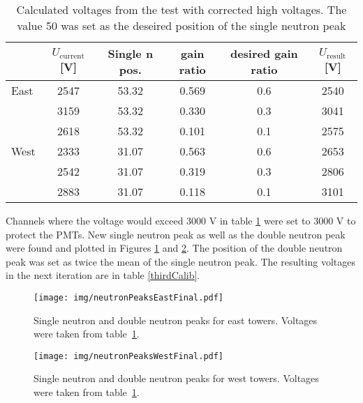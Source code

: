 \begin{table}[htb] 
\caption{Calculated voltages from the test with corrected high voltages.
The value 50 was set as the deseired position of the single neutron peak}
\label{corected}
\begin{center}
\begin{tabular}{lccccc}
 \toprule
 &$U_\text{current}$[V]&Single n pos.&gain ratio&desired gain ratio&$U_\text{result}$[V]\\
\midrule
 East&2547&53.32&0.569&0.6&2540\\
     &3159&53.32&0.330&0.3&3041\\
     &2618&53.32&0.101&0.1&2575\\
 \midrule
West&2333&31.07&0.563&0.6&2653\\
    &2542&31.07&0.319&0.3&2806\\
    &2883&31.07&0.118&0.1&3101\\
 \bottomrule
\end{tabular}
\end{center}
\end{table}

Channels where the voltage would exceed 3000 V in table \ref{corected} were set to 3000 V to
protect the PMTs. New single neutron peak as well as the double neutron peak were found and
plotted in Figures \ref{eastThird}
and \ref{westThird}. The position of the double neutron peak was set as twice the mean
of the single neutron peak.
The resulting voltages in the next iteration are in table \ref{thirdCalib}.

\begin{figure}[htb]
\begin{center}
\texttt{[image: img/neutronPeaksEastFinal.pdf]}
\end{center}
\caption{Single neutron and double neutron peaks for east towers.
Voltages were taken from table~\ref{corected}.}
\label{eastThird}
\end{figure}

\begin{figure}[htb]
\begin{center}
\texttt{[image: img/neutronPeaksWestFinal.pdf]}
\end{center}
\caption{Single neutron and double neutron peaks for west towers.
Voltages were taken from table~\ref{corected}.}
\label{westThird}
\end{figure}

